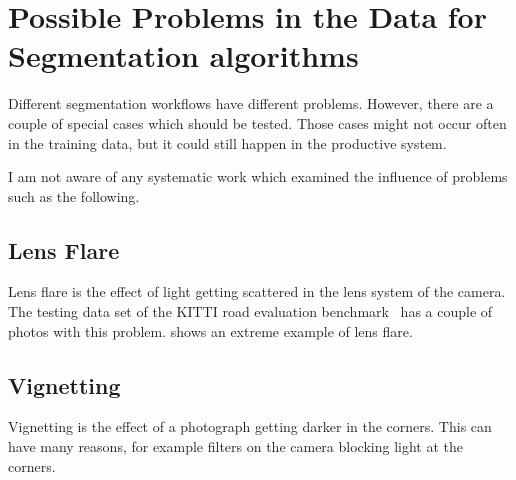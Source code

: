 
\section{Possible Problems in the Data for Segmentation algorithms}%
\label{sec:problems}

Different segmentation workflows have different problems. However, there are
a couple of special cases which should be tested. Those cases might not occur
often in the training data, but it could still happen in the productive system.

I am not aware of any systematic work which examined the influence of problems
such as the following.

\subsection{Lens Flare}
Lens flare is the effect of light getting scattered in the lens system of the
camera. The testing data set of the KITTI road evaluation
benchmark~\cite{Fritsch2013ITSC} has a couple of photos with this problem.
 shows an extreme example of lens flare.


\subsection{Vignetting}
Vignetting is the effect of a photograph getting darker in the corners. This
can have many reasons, for example filters on the camera blocking light at the
corners.


